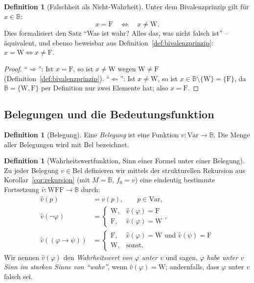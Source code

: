 \documentclass[12pt, a4paper]{article}
\theoremstyle{definition}
\newtheorem{definition}[theorem]{Definition}
\theoremstyle{remark}
\newcommand{\W}{\mathrm{W}}
\newcommand{\F}{\mathrm{F}}
\newcommand{\WFF}{\mathrm{WFF}}
\newcommand{\Var}{\mathrm{Var}}
\newcommand{\Bel}{\mathrm{Bel}}
\begin{document}
\begin{definition}[Falschheit als Nicht-Wahrheit]
\label{def:falsch_ist_nicht_wahr}
Unter dem Bivalenzprinzip gilt für $x \in \mathbb{B}$:
\[
  x = \F \quad \Longleftrightarrow \quad x \ne \W.
\]
Dies formalisiert den Satz ``Was ist wahr? Alles das, was nicht falsch ist'' -- äquivalent, und ebenso beweisbar aus Definition~\ref{def:bivalenzprinzip}: $x = \W \Leftrightarrow x \ne \F$.
\end{definition}
\begin{proof}
``$\Rightarrow$'': Ist $x = \F$, so ist $x \ne \W$ wegen $\W \ne \F$ (Definition~\ref{def:bivalenzprinzip}). ``$\Leftarrow$'': Ist $x \ne \W$, so ist $x \in \mathbb{B}\setminus\{\W\} = \{\F\}$, da $\mathbb{B}=\{\W,\F\}$ per Definition nur zwei Elemente hat; also $x=\F$.
\end{proof}

\subsection{Belegungen und die Bedeutungsfunktion}
\label{subsec:belegungen}

\begin{definition}[Belegung]
\label{def:belegung}
Eine \emph{Belegung} ist eine Funktion $v : \Var \to \mathbb{B}$. Die Menge aller Belegungen wird mit $\Bel$ bezeichnet.
\end{definition}

\begin{definition}[Wahrheitswertfunktion, Sinn einer Formel unter einer Belegung]
\label{def:wahrheitswertfunktion}
Zu jeder Belegung $v \in \Bel$ definieren wir mittels der strukturellen Rekursion aus Korollar~\ref{cor:rekursion} (mit $M = \mathbb{B}$, $f_0 = v$) eine eindeutig bestimmte Fortsetzung $\hat v : \WFF \to \mathbb{B}$ durch:
\begin{align}
  \hat v(p) &= v(p), \qquad p \in \Var, \label{eq:sem_atom}\\
  \hat v(\neg\varphi) &= \begin{cases} \W, & \hat v(\varphi) = \F \\ \F, & \hat v(\varphi) = \W \end{cases}, \label{eq:sem_neg}\\
  \hat v((\varphi \to \psi)) &= \begin{cases} \F, & \hat v(\varphi) = \W \text{ und } \hat v(\psi) = \F \\ \W, & \text{sonst.} \end{cases} \label{eq:sem_impl}
\end{align}
Wir nennen $\hat v(\varphi)$ den \emph{Wahrheitswert von $\varphi$ unter $v$} und sagen, $\varphi$ \emph{habe unter $v$ Sinn im starken Sinne von ``wahr''}, wenn $\hat v(\varphi) = \W$; andernfalls, dass $\varphi$ unter $v$ falsch sei.
\end{definition}
\end{document}
